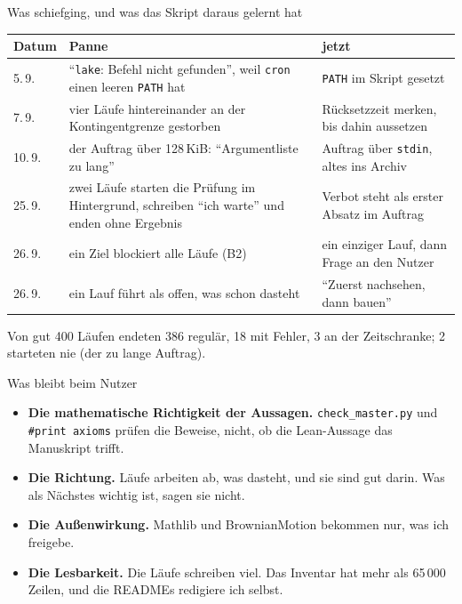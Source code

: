 \documentclass[11pt,aspectratio=169]{beamer}
\newcommand{\datei}[1]{\texttt{#1}}
\begin{document}
\begin{frame}{Was schiefging, und was das Skript daraus gelernt hat}
  \footnotesize
  \begin{tabular}{@{}lp{}p{}@{}}
    \toprule
    Datum & Panne & jetzt \\
    \midrule
    5.\,9.  & \enquote{\texttt{lake}: Befehl nicht gefunden}, weil \texttt{cron} einen leeren
              \texttt{PATH} hat & \texttt{PATH} im Skript gesetzt \\
    7.\,9.  & vier Läufe hintereinander an der Kontingentgrenze gestorben &
              Rücksetzzeit merken, bis dahin aussetzen \\
    10.\,9. & der Auftrag über 128\,KiB: \enquote{Argumentliste zu lang} &
              Auftrag über \texttt{stdin}, altes ins Archiv \\
    25.\,9. & zwei Läufe starten die Prüfung im Hintergrund, schreiben
              \enquote{ich warte} und enden ohne Ergebnis & Verbot steht als erster
              Absatz im Auftrag \\
    26.\,9. & ein Ziel blockiert alle Läufe (B2) & ein einziger Lauf, dann Frage an
              den Nutzer \\
    26.\,9. & ein Lauf führt als offen, was schon dasteht & \enquote{Zuerst nachsehen,
              dann bauen} \\
    \bottomrule
  \end{tabular}

  \medskip
  Von gut 400 Läufen endeten 386 regulär, 18 mit Fehler, 3 an der Zeitschranke;
  2 starteten nie (der zu lange Auftrag).
\end{frame}

\begin{frame}{Was bleibt beim Nutzer}
  \begin{itemize}
  \setlength\itemsep{6pt}
  \item \textbf{Die mathematische Richtigkeit der Aussagen.} \datei{check\_master.py}
    und \texttt{\#print axioms} prüfen die Beweise, nicht, ob die Lean-Aussage das
    Manuskript trifft.
  \item \textbf{Die Richtung.} Läufe arbeiten ab, was dasteht, und sie sind gut
    darin. Was als Nächstes wichtig ist, sagen sie nicht.
  \item \textbf{Die Außenwirkung.} Mathlib und BrownianMotion bekommen nur, was ich
    freigebe.
  \item \textbf{Die Lesbarkeit.} Die Läufe schreiben viel. Das Inventar hat mehr als
    65\,000 Zeilen, und die READMEs redigiere ich selbst.
  \end{itemize}
\end{frame}
\end{document}
